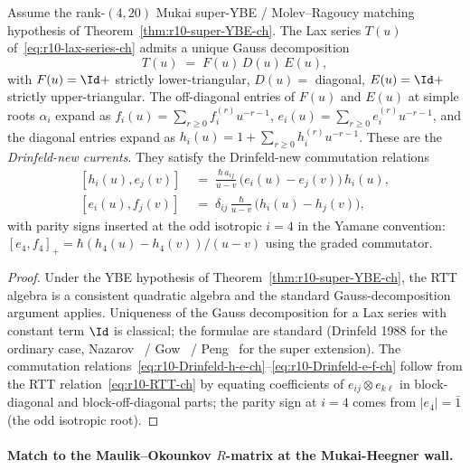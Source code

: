 \begin{theorem}[Gauss decomposition $T = FDE$ at rank $(4, 20)$]
\label{thm:r10-Gauss-ch}
Assume the rank-$(4,20)$ Mukai super-YBE / Molev--Ragoucy matching
hypothesis of Theorem~\ref{thm:r10-super-YBE-ch}.
The Lax series $T(u)$ of~\eqref{eq:r10-lax-series-ch} admits a unique
Gauss decomposition
\begin{equation}
 \label{eq:r10-Gauss-ch}
 T(u) \;=\; F(u)\, D(u)\, E(u),
\end{equation}
with $F(u) = \Id +$ strictly lower-triangular, $D(u) =$ diagonal,
$E(u) = \Id +$ strictly upper-triangular. The off-diagonal entries
of $F(u)$ and $E(u)$ at simple roots $\alpha_i$ expand as
$f_i(u) = \sum_{r \geq 0} f^{(r)}_i u^{-r-1}$,
$e_i(u) = \sum_{r \geq 0} e^{(r)}_i u^{-r-1}$, and the diagonal
entries expand as $h_i(u) = 1 + \sum_{r \geq 0} h^{(r)}_i u^{-r-1}$.
These are the \emph{Drinfeld-new currents}. They satisfy the
Drinfeld-new commutation relations
\begin{align}
 \label{eq:r10-Drinfeld-h-e-ch}
 [h_i(u), e_j(v)] \;&=\;
 \frac{\hbar\, a_{ij}}{u - v}\,
 \bigl( e_i(u) - e_j(v) \bigr)\, h_i(u), \\
 \label{eq:r10-Drinfeld-e-f-ch}
 [e_i(u), f_j(v)] \;&=\;
 \delta_{ij}\,
 \frac{\hbar}{u - v}\,
 \bigl( h_i(u) - h_j(v) \bigr),
\end{align}
with parity signs inserted at the odd isotropic $i = 4$ in the
Yamane convention: $[e_4, f_4]_+ = \hbar (h_4(u) - h_4(v))/(u - v)$
using the graded commutator.
\end{theorem}

\begin{proof}
Under the YBE hypothesis of
Theorem~\ref{thm:r10-super-YBE-ch}, the RTT algebra is a consistent
quadratic algebra and the standard Gauss-decomposition argument
applies. Uniqueness of the Gauss decomposition for a Lax series with constant
term $\Id$ is classical; the formulae are standard (Drinfeld 1988
for the ordinary case, Nazarov~\cite{Nazarov1991} / Gow~\cite{Gow2007}
/ Peng~\cite{Peng2011} for the super extension). The commutation
relations~\eqref{eq:r10-Drinfeld-h-e-ch}--\eqref{eq:r10-Drinfeld-e-f-ch}
follow from the RTT relation~\eqref{eq:r10-RTT-ch} by equating
coefficients of $e_{ij} \otimes e_{k\ell}$ in block-diagonal and
block-off-diagonal parts; the parity sign at $i = 4$ comes from
$|e_4| = \bar 1$ (the odd isotropic root).
\end{proof}

\paragraph{Match to the Maulik--Okounkov $R$-matrix at the
Mukai-Heegner wall.}

